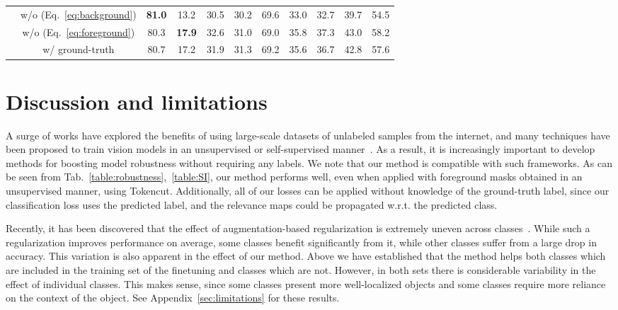 \documentclass{article}
\begin{document}
\begin{table}[t!]
\begin{center}
{\begin{tabular}{@{}l@{~~}c@{~~~~}c@{~~~~}c@{~~~~}c@{~~~~}c@{~~~~}c@{~~~~}c@{~~~~}c@{~~~~}c@{~~~~}c@{}}
        &\small{w/o  (Eq.~\ref{eq:background})}  & \textbf{81.0} & 13.2 & 30.5 & 30.2 & 69.6 & 33.0 & 32.7 & 39.7 & 54.5 \\
        &\small{w/o  (Eq.~\ref{eq:foreground}}) & 80.3 & \textbf{17.9} & 32.6 & 31.0 & 69.0 & 35.8 & 37.3 & 43.0 & 58.2  \\
        &\small{w/ ground-truth} & 80.7 & 17.2 & 31.9 & 31.3 & 69.2 & 35.6 & 36.7 & 42.8 & 57.6\\
        \bottomrule
    \end{tabular}
    }
    \smallskip
    \smallskip
    \label{table:ablation}
    \end{center}
    \vspace{-24px}
\end{table}


\section{Discussion and limitations}

A surge of works have explored the benefits of using large-scale datasets of unlabeled samples from the internet, and many techniques have been proposed to train vision models in an unsupervised or self-supervised manner~\cite{caron2021emerging,Goyal2022VisionMA}. As a result, it is increasingly important to develop methods for boosting model robustness without requiring any labels. We note that our method is compatible with such frameworks. As can be seen from Tab.~\ref{table:robustness},~\ref{table:SI}, our method performs well, even when applied with foreground masks obtained in an unsupervised manner, using Tokencut. Additionally, all of our losses can be applied without knowledge of the ground-truth label, since our classification loss  uses the predicted label, and the relevance maps could be propagated w.r.t. the predicted class.  

Recently, it has been discovered that the effect of augmentation-based regularization is extremely uneven across classes~\cite{balestriero2022effects}. While such a regularization improves performance on average, some classes benefit significantly from it, while other classes suffer from a large drop in accuracy. 
This variation is also apparent in the effect of our method. Above we have established that the method helps both classes which are included in the training set of the finetuning and classes which are not. However, in both sets there is considerable variability in the effect of individual classes. This makes sense, since some classes present more well-localized objects and some classes require more reliance on the context of the object. See Appendix~\ref{sec:limitations} for these results.
\end{document}
